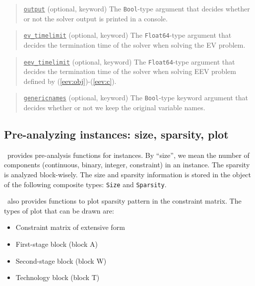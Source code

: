 \begin{quote}
	\noindent\underline{\texttt{output}} (optional, keyword) The \texttt{Bool}-type argument that decides whether or not the solver output is printed in a console.
\end{quote}

\begin{quote}
	\noindent\underline{\texttt{ev\_timelimit}} (optional, keyword) The \texttt{Float64}-type argument that decides the termination time of the solver when solving the EV problem.
\end{quote}

\begin{quote}
	\noindent\underline{\texttt{eev\_timelimit}} (optional, keyword) The \texttt{Float64}-type argument that decides the termination time of the solver when solving EEV problem defined by (\ref{eev:obj})-(\ref{eev:c}).
\end{quote}

\begin{quote}
	\noindent\underline{\texttt{genericnames}} (optional, keyword) The \texttt{Bool}-type keyword argument that decides whether or not we keep the original variable names. 
\end{quote}

\subsection{Pre-analyzing instances: size, sparsity, plot} \label{tutorial:analyze_instance}
\siplibjl\ provides pre-analysis functions for instances. By ``size'', we mean the number of components (continuous, binary, integer, constraint) in an instance. The sparsity is analyzed block-wisely. The size and sparsity information is stored in the object of the following composite types: \texttt{Size} and \texttt{Sparsity}.

\siplibjl\ also provides functions to plot sparsity pattern in the constraint matrix. The types of plot that can be drawn are:
\begin{itemize}
	\item Constraint matrix of extensive form
	\item First-stage block (block A)
	\item Second-stage block (block W)
	\item Technology block (block T)
\end{itemize}


